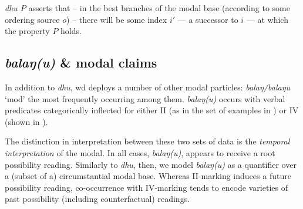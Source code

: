 \textit{dhu $ P $} %
 asserts that -- in the best branches of the modal base (according to some ordering source $ o $) -- there will be some  index $ i' $ --- a successor to $ i $ --- at which the property $ P $ holds.%
\xe%

\subsection{\textit{balaŋ(u)} \& modal claims}\label{sec:balaŋ}

In addition to \textit{dhu}, \gls{wd} deploys a number of other modal particles: \textit{balaŋ/balaŋu} `\gls{mod}' the most frequently occurring among them. \textit{balaŋ(u)} occurs with verbal predicates categorically inflected for either \gls{II} (as in the set of examples in ) or \gls{IV} (shown in ).

The distinction in interpretation between these two sets of data is the \textit{temporal interpretation} of the modal. In all cases, \textit{balaŋ(u)}, appears to receive a root possibility reading. Similarly to \textit{dhu}, then, we model \textit{balaŋ(u)} as a quantifier over a (subset of a) circumstantial modal base. Whereas \gls{II}-marking induces a future possibility reading, co-occurrence with \gls{IV}-marking tends to encode varieties of past possibility (including counterfactual) readings.

